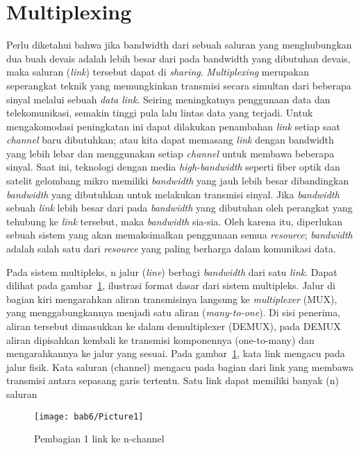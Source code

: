 \section{Multiplexing}
Perlu diketahui bahwa jika bandwidth dari sebuah saluran yang menghubungkan dua buah devais adalah lebih besar dari pada bandwidth yang dibutuhan devais, maka saluran (\textit{link}) tersebut dapat di \textit{sharing}. \textit{Multiplexing} merupakan seperangkat teknik yang memungkinkan transmisi secara simultan dari beberapa sinyal melalui sebuah \textit{data link}. Seiring meningkatnya penggunaan data dan telekomunikasi, semakin tinggi pula lalu lintas data yang terjadi. Untuk mengakomodasi peningkatan ini dapat dilakukan penambahan \textit{link} setiap saat \textit{channel} baru dibutuhkan; atau kita dapat memasang \textit{link} dengan bandwidth yang lebih lebar dan menggunakan setiap \textit{channel} untuk membawa beberapa sinyal. Saat ini, teknologi dengan media \textit{high-bandwidth} seperti fiber optik dan satelit gelombang mikro memiliki \textit{bandwidth} yang jauh lebih besar dibandingkan \textit{bandwidth} yang dibutuhkan untuk melakukan transmisi sinyal. Jika \textit{bandwidth} sebuah \textit{link} lebih besar dari pada \textit{bandwidth} yang dibutuhan oleh perangkat yang tehubung ke \textit{link} tersebut, maka \textit{bandwidth} sia-sia. Oleh karena itu, diperlukan sebuah sistem yang akan memaksimalkan penggunaan semua \textit{resource}; \textit{bandwidth} adalah salah satu dari \textit{resource} yang paling berharga dalam komunikasi data.

Pada sistem multipleks, n jalur (\textit{line}) berbagi \textit{bandwidth} dari satu \textit{link}. Dapat dilihat pada gambar~\ref{fig6:1}, ilustrasi format dasar dari sistem multipleks. Jalur di bagian kiri mengarahkan aliran transmisinya langsung ke \textit{multiplexer} (MUX), yang menggabungkannya menjadi satu aliran (\textit{many-to-one}). Di sisi penerima, aliran tersebut dimasukkan ke dalam demultiplexer (DEMUX), pada DEMUX aliran dipisahkan kembali ke transmisi komponennya (one-to-many) dan mengarahkannya ke jalur yang sesuai. Pada gambar~\ref{fig6:1}, kata link mengacu pada jalur fisik. Kata saluran (channel) mengacu pada bagian dari link yang membawa transmisi antara sepasang garis tertentu. Satu link dapat memiliki banyak (n) saluran

\begin{figure}[htbp]
  \centering
  \texttt{[image: bab6/Picture1]}
  \caption{Pembagian 1 link ke n-channel}
  \label{fig6:1}
\end{figure}

